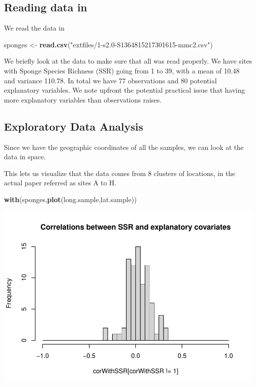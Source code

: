 \documentclass[
]{book}
\newenvironment{Shaded}{\begin{snugshade}}{\end{snugshade}}
\newcommand{\FunctionTok}[1]{\textcolor[rgb]{0.13,0.29,0.53}{\textbf{#1}}}
\newcommand{\NormalTok}[1]{#1}
\newcommand{\OtherTok}[1]{\textcolor[rgb]{0.56,0.35,0.01}{#1}}
\newcommand{\StringTok}[1]{\textcolor[rgb]{0.31,0.60,0.02}{#1}}
\begin{document}
\subsection{Reading data in}\label{reading-data-in}

We read the data in

\begin{Shaded}
\begin{Highlighting}[]
\NormalTok{sponges }\OtherTok{\textless{}{-}} \FunctionTok{read.csv}\NormalTok{(}\StringTok{"extfiles/1{-}s2.0{-}S1364815217301615{-}mmc2.csv"}\NormalTok{)}
\end{Highlighting}
\end{Shaded}

We briefly look at the data to make sure that all was read properly. We have sites with Sponge Species Richness (SSR) going from 1 to 39, with a mean of 10.48 and variance 110.78. In total we have 77 observations and 80 potential explanatory variables. We note upfront the potential practical issue that having more explanatory variables than observations raises.

\subsection{Exploratory Data Analysis}\label{exploratory-data-analysis}

Since we have the geographic coordinates of all the samples, we can look at the data in space.

This lets us visualize that the data comes from 8 clusters of locations, in the actual paper referred as sites A to H.

\begin{Shaded}
\begin{Highlighting}[]
\FunctionTok{with}\NormalTok{(sponges,}\FunctionTok{plot}\NormalTok{(long.sample,lat.sample)) }
\end{Highlighting}
\end{Shaded}

\includegraphics{ECOMODbook_files/figure-latex/unnamed-chunk-87-1.pdf}
\end{document}
